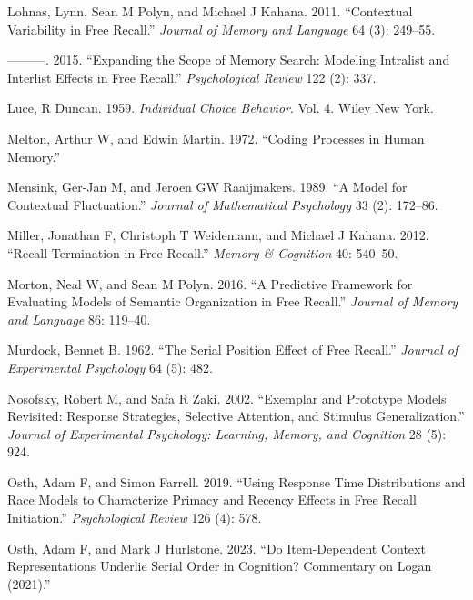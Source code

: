 \documentclass[
  letterpaper,
  11pt,
  english,
  singlespacing,
  headsepline]{MastersDoctoralThesis}
\newlength{\cslhangindent}
\newenvironment{CSLReferences}[2] %
 {\begin{list}{}{%
  \setlength{\itemindent}{0pt}
  \setlength{\leftmargin}{0pt}
  \setlength{\parsep}{0pt}
  \ifodd #1
   \setlength{\leftmargin}{\cslhangindent}
   \setlength{\itemindent}{-1\cslhangindent}
  \fi
  \setlength{\itemsep}{#2\baselineskip}}}
 {\end{list}}
\begin{document}
\begin{CSLReferences}{1}{0}
Lohnas, Lynn, Sean M Polyn, and Michael J Kahana. 2011. {``Contextual
Variability in Free Recall.''} \emph{Journal of Memory and Language} 64
(3): 249--55.

---------. 2015. {``Expanding the Scope of Memory Search: Modeling
Intralist and Interlist Effects in Free Recall.''} \emph{Psychological
Review} 122 (2): 337.

Luce, R Duncan. 1959. \emph{Individual Choice Behavior}. Vol. 4. Wiley
New York.

Melton, Arthur W, and Edwin Martin. 1972. {``Coding Processes in Human
Memory.''}

Mensink, Ger-Jan M, and Jeroen GW Raaijmakers. 1989. {``A Model for
Contextual Fluctuation.''} \emph{Journal of Mathematical Psychology} 33
(2): 172--86.

Miller, Jonathan F, Christoph T Weidemann, and Michael J Kahana. 2012.
{``Recall Termination in Free Recall.''} \emph{Memory \& Cognition} 40:
540--50.

Morton, Neal W, and Sean M Polyn. 2016. {``A Predictive Framework for
Evaluating Models of Semantic Organization in Free Recall.''}
\emph{Journal of Memory and Language} 86: 119--40.

Murdock, Bennet B. 1962. {``The Serial Position Effect of Free
Recall.''} \emph{Journal of Experimental Psychology} 64 (5): 482.

Nosofsky, Robert M, and Safa R Zaki. 2002. {``Exemplar and Prototype
Models Revisited: Response Strategies, Selective Attention, and Stimulus
Generalization.''} \emph{Journal of Experimental Psychology: Learning,
Memory, and Cognition} 28 (5): 924.

Osth, Adam F, and Simon Farrell. 2019. {``Using Response Time
Distributions and Race Models to Characterize Primacy and Recency
Effects in Free Recall Initiation.''} \emph{Psychological Review} 126
(4): 578.

Osth, Adam F, and Mark J Hurlstone. 2023. {``Do Item-Dependent Context
Representations Underlie Serial Order in Cognition? Commentary on Logan
(2021).''}


\end{CSLReferences}
\end{document}
